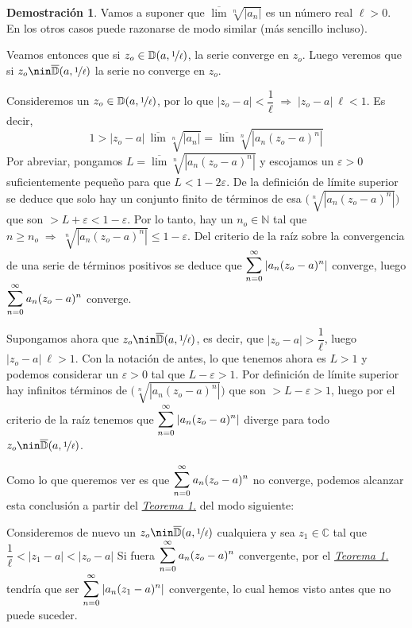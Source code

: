 \documentclass[12pt,twoside]{report}
\theoremstyle{azul}
\theoremstyle{azul2}
\theoremstyle{plain}
\theoremstyle{definition}
\newtheorem*{dem}{Demostración}
\theoremstyle{remark}
\begin{document}
\begin{dem}
Vamos a suponer que $\overline{\lim} \sqrt[n]{|a_n|}$ es un n{\'u}mero real $\ell >0$. En los otros casos puede razonarse de modo similar (m{\'a}s sencillo incluso).

Veamos entonces que si $z_o \in \mathbb{D}(a,\nicefrac{1}{\ell})$, la serie converge en $z_o$. Luego veremos que si $z_o \nin \overline{\mathbb{D}}(a,\nicefrac{1}{\ell})$ la serie no converge en $z_o$. 

Consideremos un $z_o \in \mathbb{D}(a,\nicefrac{1}{\ell})$, por lo que $|z_o - a|<\dfrac{1}{\ell} \; \Rightarrow \; |z_o - a | \: \ell < 1$. Es decir,
$$1 > |z_o - a| \: \overline{\lim} \sqrt[n]{|a_n|} =\overline{\lim} \sqrt[n]{|a_n (z_o - a)^n|}$$
Por abreviar, pongamos $L=\overline{\lim} \sqrt[n]{|a_n (z_o - a)^n|}$ y escojamos un $\varepsilon > 0$ suficientemente pequeño para que $L<1-2\varepsilon$. De la definici{\'o}n de l{\'i}mite superior se deduce que solo hay un conjunto finito de t{\'e}rminos de esa $\Big(\sqrt[n]{|a_n (z_o - a)^n|}\Big)$ que son $> L + \varepsilon < 1 - \varepsilon$. Por lo tanto, hay un $n_o \in \mathbb{N}$ tal que $n \geq n_o \; \Rightarrow \; \sqrt[n]{|a_n (z_o - a)^n|} \leq 1- \varepsilon$. Del criterio de la ra{\'i}z sobre la convergencia de una serie de t{\'e}rminos positivos se deduce que 
$\displaystyle \mathlarger{\sum}_{n=0}^{\infty} \: |a_n (z_o - a)^n| $ converge, luego $\displaystyle \mathlarger{\sum}_{n=0}^{\infty} \: a_n (z_o - a)^n$ converge.

Supongamos ahora que $z_o \nin \overline{\mathbb{D}}(a, \nicefrac{1}{\ell})$, es decir, que $|z_o - a| > \dfrac{1}{\ell}$, luego $|z_o - a| \: \ell > 1$. Con la notaci{\'o}n de antes, lo que tenemos ahora es $L>1$ y podemos considerar un $\varepsilon > 0$ tal que $L - \varepsilon > 1$. Por definici{\'o}n de l{\'i}mite superior hay infinitos t{\'e}rminos de $\Big(\sqrt[n]{|a_n (z_o - a)^n|}\Big)$ que son $> L - \varepsilon > 1$, luego por el criterio de la ra{\'i}z tenemos que $\displaystyle \mathlarger{\sum}_{n=0}^{\infty} \: |a_n (z_o - a)^n| $ diverge para todo $z_o \nin \overline{\mathbb{D}}(a,\nicefrac{1}{\ell})$. 

Como lo que queremos ver es que $\displaystyle \mathlarger{\sum}_{n=0}^{\infty} \: a_n (z_o - a)^n$ no converge, podemos alcanzar esta conclusi{\'o}n a partir del \hyperref[teo111]{\textit{Teorema 1.}} del modo siguiente:

Consideremos de nuevo un $z_o \nin \overline{\mathbb{D}}(a,\nicefrac{1}{\ell})$ cualquiera y sea $z_1 \in \mathbb{C}$ tal que $\dfrac{1}{\ell} < |z_1-a| < |z_o - a|$ Si fuera $\displaystyle \mathlarger{\sum}_{n=0}^{\infty} \: a_n (z_o - a)^n$ convergente, por el \hyperref[teo111]{\textit{Teorema 1.}} tendr{\'i}a que ser $\displaystyle \mathlarger{\sum}_{n=0}^{\infty} \: |a_n (z_1 - a)^n| $ convergente, lo cual hemos visto antes que no puede suceder. 
\end{dem}
\end{document}
